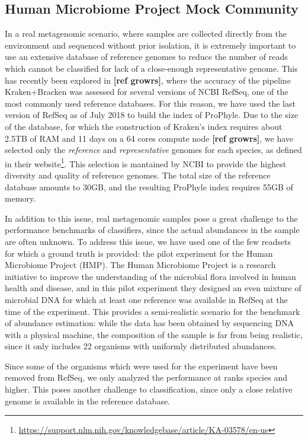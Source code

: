 \subsection{Human Microbiome Project Mock Community}

In a real metagenomic scenario, where samples are collected directly from the environment and sequenced without prior isolation, it is extremely important to use an extensive database of reference genomes to reduce the number of reads which cannot be classified for lack of a close-enough representative genome. This has recently been explored in \textbf{[ref growrs]}, where the accuracy of the pipeline Kraken+Bracken was assessed for several versions of NCBI RefSeq, one of the most commonly used reference databases. For this reason, we have used the last version of RefSeq as of July 2018 to build the index of ProPhyle. Due to the size of the database, for which the construction of Kraken's index requires about 2.5TB of RAM and 11 days on a 64 cores compute node \textbf{[ref growrs]}, we have selected only the \textit{reference} and \textit{representative} genomes for each species, as defined in their website\footnote{\url{https://support.nlm.nih.gov/knowledgebase/article/KA-03578/en-us}}. This selection is mantained by NCBI to provide the highest diversity and quality of reference genomes. The total size of the reference database amounts to 30GB, and the resulting ProPhyle index requires 55GB of memory.

In addition to this issue, real metagenomic samples pose a great challenge to the performance benchmarks of classifiers, since the actual abundances in the sample are often unknown. To address this issue, we have used one of the few readsets for which a ground truth is provided: the pilot experiment for the Human Microbiome Project (HMP). The Human Microbiome Project is a research initiative to improve the understanding of the microbial flora involved in human health and disease, and in this pilot experiment they designed an even mixture of microbial DNA for which at least one reference was available in RefSeq at the time of the experiment. This provides a semi-realistic scenario for the benchmark of abundance estimation: while the data has been obtained by sequencing DNA with a physical machine, the composition of the sample is far from being realistic, since it only includes 22 organisms with uniformly distributed abundances.

Since some of the organisms which were used for the experiment have been removed from RefSeq, we only analyzed the performance at ranks species and higher. This poses another challenge to classification, since only a close relative genome is available in the reference database.

